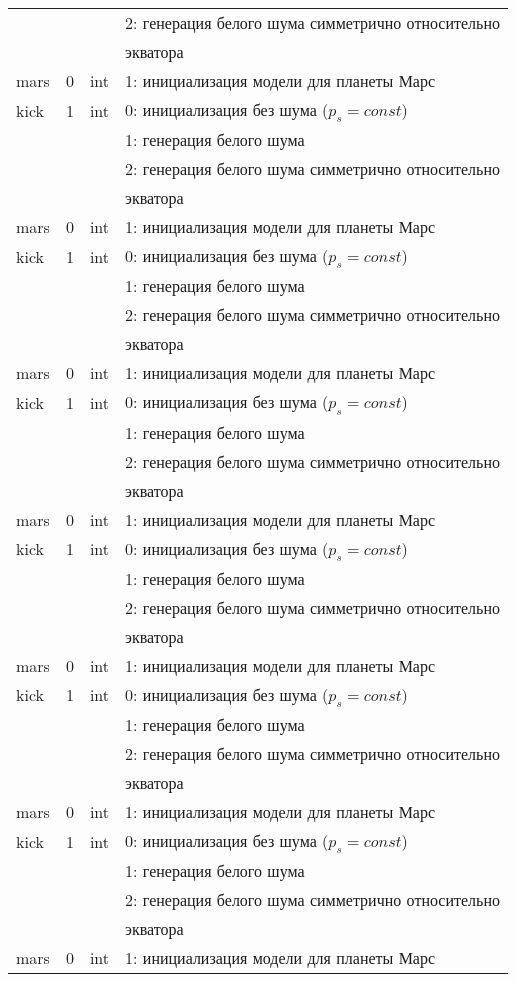 \begin{longtable*}[c]{|l|c|l|l|}
      &   &     & 2: генерация белого шума симметрично относительно \\
  & & & экватора    \\
 mars & 0 & int & 1: инициализация модели для планеты Марс     \\
kick & 1 & int & 0: инициализация без шума ($p_s = const$) \\
      &   &     & 1: генерация белого шума                  \\
      &   &     & 2: генерация белого шума симметрично относительно \\
  & & & экватора    \\
 mars & 0 & int & 1: инициализация модели для планеты Марс     \\
kick & 1 & int & 0: инициализация без шума ($p_s = const$) \\
      &   &     & 1: генерация белого шума                  \\
      &   &     & 2: генерация белого шума симметрично относительно \\
  & & & экватора    \\
 mars & 0 & int & 1: инициализация модели для планеты Марс     \\
kick & 1 & int & 0: инициализация без шума ($p_s = const$) \\
      &   &     & 1: генерация белого шума                  \\
      &   &     & 2: генерация белого шума симметрично относительно \\
  & & & экватора    \\
 mars & 0 & int & 1: инициализация модели для планеты Марс     \\
kick & 1 & int & 0: инициализация без шума ($p_s = const$) \\
      &   &     & 1: генерация белого шума                  \\
      &   &     & 2: генерация белого шума симметрично относительно \\
  & & & экватора    \\
 mars & 0 & int & 1: инициализация модели для планеты Марс     \\
kick & 1 & int & 0: инициализация без шума ($p_s = const$) \\
      &   &     & 1: генерация белого шума                  \\
      &   &     & 2: генерация белого шума симметрично относительно \\
  & & & экватора    \\
 mars & 0 & int & 1: инициализация модели для планеты Марс     \\
kick & 1 & int & 0: инициализация без шума ($p_s = const$) \\
      &   &     & 1: генерация белого шума                  \\
      &   &     & 2: генерация белого шума симметрично относительно \\
  & & & экватора    \\
 mars & 0 & int & 1: инициализация модели для планеты Марс     \\ 
 \hline 
\end{longtable*}

